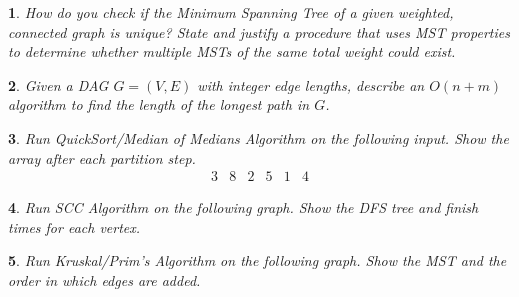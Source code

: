 \documentclass[%
addpoints]{exam}
\theoremstyle{problem}
\newtheorem{p}{}
\begin{document}
\begin{p}

How do you check if the Minimum Spanning Tree of a given weighted, connected graph is \emph{unique}? State and justify a procedure that uses MST properties to determine whether multiple MSTs of the same total weight could exist.
\hfill\end{p}

\begin{p}

Given a DAG \( G = (V, E) \) with integer edge lengths, describe an \(O(n + m)\) algorithm to find the length of the \emph{longest path} in \( G \).
\hfill\end{p}

\begin{p}
Run QuickSort/Median of Medians Algorithm on the following input. Show the array after each partition step.
\[
\begin{array}{cccccc}
    3 & 8 & 2 & 5 & 1 & 4
\end{array}
\]
\hfill\end{p}

\begin{p}
Run SCC Algorithm on the following graph. Show the DFS tree and finish times for each vertex.
\begin{center}
\end{center}
\hfill\end{p}

\begin{p}
Run Kruskal/Prim's Algorithm on the following graph. Show the MST and the order in which edges are added.
\hfill\end{p}
\end{document}
